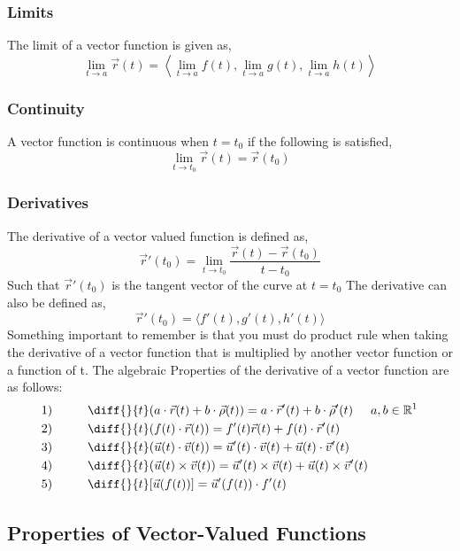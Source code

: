 \documentclass{article}
\begin{document}
\subsubsection{Limits}
The limit of a vector function is given as,
$$\lim_{t\to a}\vec{r}(t) = \left\langle \lim_{t\to a}f(t), \lim_{t\to a}g(t), \lim_{t\to a}h(t) \right\rangle$$

\subsubsection{Continuity}
A vector function is continuous when $t = t_0$ if the following is satisfied,
$$\lim_{t\to t_0}\vec{r}(t) = \vec{r}(t_0)$$

\subsubsection{Derivatives}
The derivative of a vector valued function is defined as,
$$\vec{r}'(t_0) = \lim_{t\to t_0}\frac{\vec{r}(t)-\vec{r}(t_0)}{t-t_0}$$
Such that $\vec{r}'(t_0)$ is the tangent vector of the curve at $t = t_0$
The derivative can also be defined as,
$$\vec{r}'(t_0) = \langle f'(t),g'(t),h'(t) \rangle$$
Something important to remember is that you must do product rule when taking the derivative of a vector function that is multiplied by another vector function or a function of t. The algebraic Properties of the derivative of a vector function are as follows:
\begin{align*}
    &1)\hspace{1cm}\diff{}{t}(a\cdot\vec{r}(t)+b\cdot\vec{\rho}(t))= a\cdot\vec{r}'(t)+b\cdot\vec{\rho}'(t)\hspace{0.5cm}a,b\in\mathbb{R}^1 \\
    &2)\hspace{1cm}\diff{}{t}(f(t)\cdot\vec{r}(t))= f'(t)\vec{r}(t)+f(t)\cdot\vec{r}'(t) \\
    &3)\hspace{1cm}\diff{}{t}(\vec{u}(t)\cdot\vec{v}(t))= \vec{u}'(t)\cdot\vec{v}(t)+\vec{u}(t)\cdot\vec{v}'(t) \\
    &4)\hspace{1cm}\diff{}{t}(\vec{u}(t)\times\vec{v}(t))= \vec{u}'(t)\times\vec{v}(t)+\vec{u}(t)\times\vec{v}'(t) \\
    &5)\hspace{1cm}\diff{}{t}[\vec{u}(f(t))]=\vec{u}'(f(t))\cdot f'(t)
\end{align*}


\subsection{Properties of Vector-Valued Functions}
\end{document}
